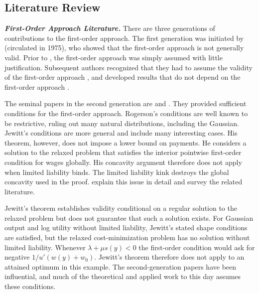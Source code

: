 \subsection{Literature Review}
\label{sec:literature-discussion}
\medskip\noindent\textit{\textbf{First-Order Approach Literature.}}
There are three generations of contributions to the first-order approach. The first generation was initiated by \textcite{mirrlees1999} (circulated in 1975), who showed that the first-order approach is not generally valid. Prior to \textcite{mirrlees1999}, the first-order approach was simply assumed with little justification. Subsequent authors recognized that they had to assume the validity of the first-order approach \parencite{holmstrom1978incentives}, and developed results that do not depend on the first-order approach \parencite{grossman1983,araujo2001general}.

The seminal papers in the second generation are \textcite{rogerson1985} and \textcite{jewitt1988justifying}. They provided sufficient conditions for the first-order approach. Rogerson's conditions are well known to be restrictive, ruling out many natural distributions, including the Gaussian. Jewitt's conditions are more general and include many interesting cases. His theorem, however, does not impose a lower bound on payments. He considers a solution to the relaxed problem that satisfies the interior pointwise first-order condition for wages globally. His concavity argument therefore does not apply when limited liability binds. The limited liability kink destroys the global concavity used in the proof. \textcite{chaigneau2022should} explain this issue in detail and survey the related literature.

Jewitt's theorem establishes validity conditional on a regular solution to the relaxed problem but does not guarantee that such a solution exists. For Gaussian output and log utility without limited liability, Jewitt's stated shape conditions are satisfied, but the relaxed cost-minimization problem has no solution without limited liability. Whenever $\lambda + \mu s(y)<0$ the first-order condition would ask for negative $1/u'(w(y)+w_0)$. Jewitt's theorem therefore does not apply to an attained optimum in this example. The second-generation papers have been influential, and much of the theoretical and applied work to this day assumes these conditions.

